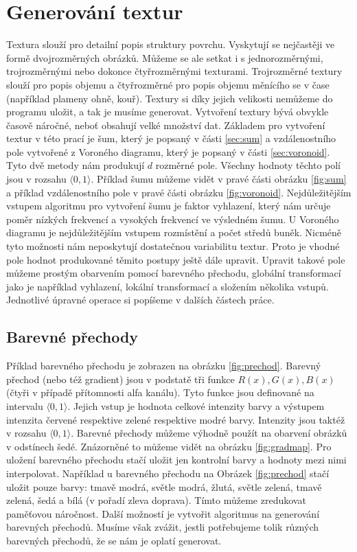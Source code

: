 
\section{Generování textur}
\label{sec:texture}
Textura slouží pro detailní popis struktury povrchu.
Vyskytují se nejčastěji ve formě dvojrozměrných obrázků.
Můžeme se ale setkat i s jednorozměrnými, trojrozměrnými nebo dokonce čtyřrozměrnými texturami.
Trojrozměrné textury slouží pro popis objemu a čtyř\-roz\-měr\-né pro popis objemu měnícího se v čase (například plameny ohně, kouř).
Textury si díky jejich velikosti nemůžeme do programu uložit, a tak je musíme generovat.
Vytvoření textury bývá obvykle časově náročné, neboť obsahují velké množství dat.
Základem pro vytvoření textur v této prací je šum, který je popsaný v části \ref{sec:sum} a vzdálenostního pole vytvořené z Voroného diagramu, který je popsaný v části \ref{sec:voronoid}.
Tyto dvě metody nám produkují $d$ rozměrné pole.
Všechny hodnoty těchto polí jsou v rozsahu $\langle 0,1 \rangle$.
Příklad šumu můžeme vidět v pravé části obrázku \ref{fig:sum} a příklad vzdálenostního pole v pravé části obrázku \ref{fig:voronoid}.
Nejdůležitějším vstupem algoritmu pro vytvoření šumu je faktor vyhlazení, který nám určuje poměr nízkých frekvencí a vysokých frekvencí ve výsledném šumu.
U Voroného diagramu je nejdůležitějším vstupem rozmístění a počet středů buněk.
Nicméně tyto možnosti nám neposkytují dos\-ta\-teč\-nou variabilitu textur.
Proto je vhodné pole hodnot produkované těmito postupy ještě dále upravit.
Upravit takové pole můžeme prostým obarvením pomocí barevného přechodu, globální transformací jako je například vyhlazení, lokální transformací a složením několika vstupů.
Jednotlivé úpravné operace si popíšeme v dalších částech práce.

\subsection{Barevné přechody}
Příklad barevného přechodu je zobrazen na obrázku \ref{fig:prechod}.
Barevný přechod (nebo též gradient) jsou v podstatě tři funkce $R(x),G(x),B(x)$ (čtyři v případě přítomnosti alfa kanálu).
Tyto funkce jsou definované na intervalu $\langle 0,1 \rangle$.
Jejich vstup je hodnota celkové intenzity barvy a výstupem intenzita červené respektive zelené respektive modré barvy.
Intenzity jsou taktéž v rozsahu $\langle 0,1 \rangle$.
Barevné přechody můžeme výhodně použít na obarvení obrázků v odstínech šedé.
Znázorněné to můžeme vidět na obrázku \ref{fig:gradmap}.
Pro uložení barevného přechodu stačí uložit jen kontrolní barvy a hodnoty mezi nimi interpolovat.
Například u barevného přechodu na Obrázek \ref{fig:prechod} stačí uložit pouze barvy: tmavě modrá, světle modrá, žlutá, světle zelená, tmavě zelená, šedá a bílá (v pořadí zleva doprava).
Tímto můžeme zredukovat paměťovou náročnost.
Další možností je vytvořit algoritmus na generování barevných přechodů.
Musíme však zvážit, jestli potřebujeme tolik různých barevných přechodů, že se nám je oplatí generovat.


